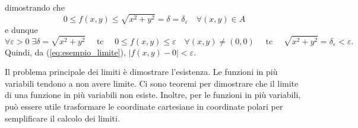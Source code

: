 \begin{example}
\begin{equation*}
    \end{equation*}
    dimostrando che
    \begin{equation}\label{eq:esempio_limite}
        0\leq f(x,y)\leq \sqrt{x^2+y^2}=\delta=\delta_\varepsilon\quad \forall(x,y)\in A
    \end{equation}
    e dunque
    \begin{equation*}
        \forall\varepsilon>0\;\exists\delta = \sqrt{x^2+y^2}\quad \text{ tc }\quad 0\leq f(x,y)\leq\varepsilon\quad\forall(x,y)\neq(0,0)\quad\text{ tc }\quad \sqrt{x^2+y^2}=\delta_\varepsilon<\varepsilon.
    \end{equation*}
    Quindi, da (\ref{eq:esempio_limite}), $|f(x,y)-0|<\varepsilon$.
\end{example}

Il problema principale dei limiti è dimostrare l'esistenza. Le funzioni in più variabili tendono a non avere limite. Ci sono teoremi per dimostrare che il limite di una funzione in più variabili non esiste. Inoltre, per le funzioni in più variabili, può essere utile trasformare le coordinate cartesiane in coordinate polari per semplificare il calcolo dei limiti.

